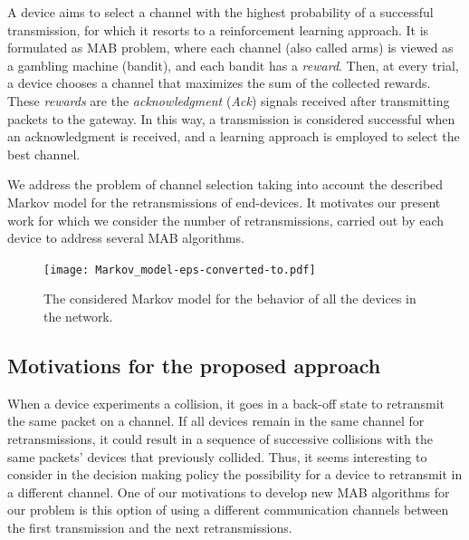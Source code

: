 A device aims to select a channel with the highest probability of a successful transmission, for which it resorts to a reinforcement learning approach. It is formulated as MAB problem, where each channel (also called arms) is viewed as a gambling machine (bandit), and each bandit has a \emph{reward}. Then, at every trial, a device chooses a channel that maximizes the sum of the collected rewards. These \emph{rewards} are the \emph{acknowledgment} (\emph{Ack}) signals received after transmitting packets to the gateway. In this way, a transmission is considered successful when an acknowledgment is received, and a learning approach is employed to select the best channel.

We address the problem of channel selection taking into account the described Markov model for the retransmissions of end-devices.
It motivates our present work for which we consider the number of retransmissions, carried out by each device to address several MAB algorithms.

\begin{figure}[htp!]  %
	\centering
	\texttt{[image: Markov\_model-eps-converted-to.pdf]}
	\caption{The considered Markov model for the behavior of all the devices in the network.}
	\label{fig:43:Markov_model}
\end{figure}
%

\subsection{Motivations for the proposed approach}
\label{sub:43:motivations}

When a device experiments a collision, it goes in a back-off state to retransmit the same packet on a channel.
If all devices remain in the same channel for retransmissions, it could result in a sequence of successive collisions with the same packets' devices that previously collided.
%
Thus, it seems interesting to consider in the decision making policy the possibility for a device to retransmit in a different channel.
One of our motivations to develop new MAB algorithms for our problem is this option of using a different communication channels between the first transmission and the next retransmissions.

